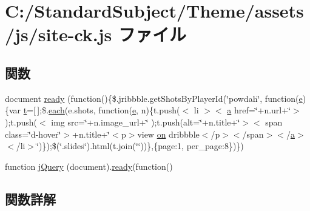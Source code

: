 \hypertarget{site-ck_8js}{}\section{C\+:/\+Standard\+Subject/\+Theme/assets/js/site-\/ck.js ファイル}
\label{site-ck_8js}
\subsection*{関数}
\begin{DoxyCompactItemize}
\item 
document \hyperlink{site-ck_8js_a0671202d69b3545ff26875d6ca37aa5c}{ready} (function()\{\$.jribbble.\+get\+Shots\+By\+Player\+Id(\char`\"{}powdah\char`\"{}, function(\hyperlink{jribbble_8js_a2c038346d47955cbe2cb91e338edd7e1}{e})\{var \hyperlink{jribbble_8js_a5459dd59c2ac7c323d9ca8bca22ff249}{t}=\mbox{[}$\,$\mbox{]};\$.\hyperlink{jquery-1_810_82_8min_8js_af24c9ea1e34372f8c8b312b35586008d}{each}(e.\+shots, function(\hyperlink{jribbble_8js_a2c038346d47955cbe2cb91e338edd7e1}{e}, n)\{t.\+push(\textquotesingle{}$<$ li $>$$<$ \hyperlink{bootstrap_8min_8js_a7318f59fb86a4437995ee89c780c51ac}{a} href=\char`\"{}\textquotesingle{}+n.\+url+\textquotesingle{}\char`\"{}$>$\textquotesingle{});t.\+push(\textquotesingle{}$<$ img src=\char`\"{}\textquotesingle{}+n.\+image\+\_\+url+\textquotesingle{}\char`\"{} \textquotesingle{});t.\+push(\textquotesingle{}alt=\char`\"{}\textquotesingle{}+n.\+title+\textquotesingle{}\char`\"{}$>$$<$ span class=\char`\"{}d-\/hover\char`\"{}$>$\textquotesingle{}+n.\+title+\char`\"{}$<$p$>$view \hyperlink{jquery-1_810_82_8min_8js_a9d5fa4fe98b38569490d55d1a97b0f72}{on} dribbble$<$/p$>$$<$/span$>$$<$/\hyperlink{bootstrap_8min_8js_a7318f59fb86a4437995ee89c780c51ac}{a}$>$$<$/li$>$\char`\"{})\});\$(\char`\"{}.slides\char`\"{}).html(t.\+join(\char`\"{}\char`\"{}))\},\{page\+:1, per\+\_\+page\+:8\})\})
\item 
function \hyperlink{site-ck_8js_a5c1c7770c4c44dde3dcba63aa2a48056}{j\+Query} (document).\hyperlink{site-ck_8js_a0671202d69b3545ff26875d6ca37aa5c}{ready}(function()
\end{DoxyCompactItemize}


\subsection{関数詳解}
\hypertarget{site-ck_8js_a5c1c7770c4c44dde3dcba63aa2a48056}{}
